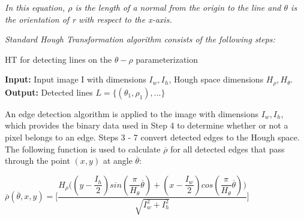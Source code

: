 \emph{\color{green}In this equation, \textit{$ \rho $} is the length of a normal from the origin to the line and \textit{$ \theta $} is the orientation of \textit{r} with respect to the x-axis.}
 

 
\emph{\color{green}Standard Hough Transformation algorithm consists of the following steps:}
 
\begin{algorithm}[h]

 \caption{ HT for detecting lines on the $\theta - \rho$ parameterization}
\begin{algorithmic}[1]
        \newline
        \textbf{Input: }Input image I with dimensions $I_{w},I_{h}$, Hough space dimensions $H_{\rho},H_{\theta}$.\newline
        \textbf{Output:} Detected lines $L=\lbrace(\theta_{1},\rho_{1}),...\rbrace$ 
         \EndIf
         \EndFor
        
        \EndProcedure
 \end{algorithmic}    
 \end{algorithm}
 
 
An edge detection algorithm is applied to the image with dimensions $I_{w}, I_{h}$, which provides the binary data used in Step 4 to determine whether or not a pixel belongs to an edge. Steps 3 - 7 convert detected edges to the Hough space. The following function is used to calculate $\overline{\rho}$ for all detected edges that pass through the point $(x,y)$ at angle $\overline{\theta}$: 
 
 
 \begin{center}
 
 
 \emph{\color{green}$ \overline{\rho}(\overline{\theta},x,y) = \Bigg[\dfrac{H_{\rho}\big((y-\dfrac{I_{h}}{2})sin(\dfrac{\pi}{H_{\theta}}\overline{\theta})+(x-\dfrac{I_{w}}{2})cos(\dfrac{\pi}{H_{\theta}}\overline{\theta})\big)}{\sqrt{I^{2}_{w}+I^{2}_{h}}}\Bigg] $ }
 \end{center}
 

